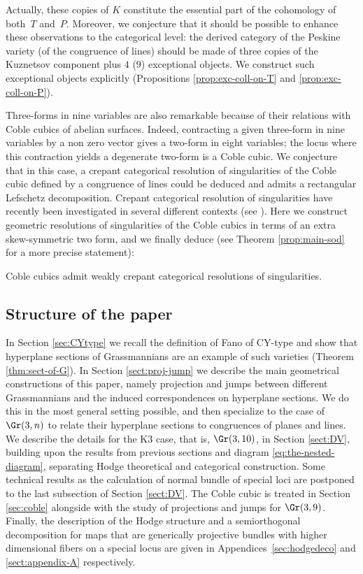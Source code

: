 Actually, these copies of $K$ constitute the essential part of the cohomology
of both~$T$ and~$P$.
Moreover, we conjecture that it should be possible to enhance these observations to the categorical
level: the derived category of the Peskine variety (\resp of the congruence of lines)
should be made of three copies of the Kuznetsov component plus $4$ (\resp $9$) exceptional
objects. We construct such exceptional objects explicitly (Propositions \ref{prop:exc-coll-on-T} and \ref{prop:exc-coll-on-P}).

Three-forms in nine variables are also remarkable because of their relations with
Coble cubics of abelian surfaces. Indeed, contracting a given
three-form in nine variables by a non zero vector gives a two-form in eight
variables; the locus where this contraction yields a degenerate two-form is
a Coble cubic. We conjecture that in this case, a crepant categorical
resolution of singularities of the Coble cubic defined by a congruence of lines could be deduced and admits a rectangular Lefschetz decomposition. Crepant categorical resolution of singularities
have recently been investigated in several different contexts (see \cite{kuz-lefschetz,
leuschke, lunts}). Here we construct geometric resolutions of
singularities of the Coble cubics in terms of an extra skew-symmetric two form,
and we finally deduce
(see Theorem \ref{prop:main-sod} for a more precise statement):

\begin{theorem*}
Coble cubics admit weakly crepant categorical resolutions of singularities.
\end{theorem*}

\subsection*{Structure of the paper}
In Section \ref{sec:CYtype} we recall the definition of Fano of CY-type and show that hyperplane sections of Grassmannians are an
example of such varieties (Theorem \ref{thm:sect-of-G}). In Section \ref{sect:proj-jump} we describe the main geometrical constructions
of this paper, namely projection and jumps between different Grassmannians and the induced correspondences on hyperplane sections.
We do this in the most general setting possible, and then specialize to the case of $\Gr(3,n)$ to relate their hyperplane sections
to congruences of planes and lines. We describe the details for the K3 case, that is, $\Gr(3,10)$, in Section \ref{sect:DV}, building upon the results
from previous sections and diagram \eqref{eq:the-nested-diagram}, separating Hodge theoretical and categorical construction. Some technical
results as the calculation of normal bundle of special loci are postponed to the last subsection of Section \ref{sect:DV}.
The Coble cubic is treated in Section \ref{sec:coble} alongside with the study of projections and jumps for $\Gr(3,9)$.
Finally, the description of the Hodge structure and a semiorthogonal decomposition for maps that are generically projective bundles
with higher dimensional fibers on a special locus are given in Appendices~\ref{sec:hodgedeco} and \ref{sect:appendix-A} respectively.

